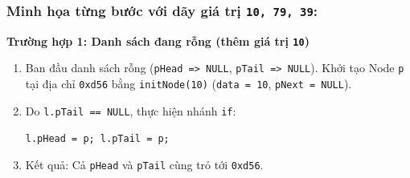 \documentclass[12pt,a4paper]{article}
\begin{document}
\subsubsection*{Minh họa từng bước với dãy giá trị \texttt{10, 79, 39}:}

\noindent\textbf{Trường hợp 1: Danh sách đang rỗng (thêm giá trị \texttt{10})}
\begin{enumerate}[itemsep=0.15em]
    \item Ban đầu danh sách rỗng (\texttt{pHead => NULL}, \texttt{pTail => NULL}). Khởi tạo Node \texttt{p} tại địa chỉ \texttt{0xd56} bằng \texttt{initNode(10)} (\texttt{data = 10}, \texttt{pNext = NULL}).
    \item Do \texttt{l.pTail == NULL}, thực hiện nhánh \texttt{if}:
    \begin{center}
        \texttt{l.pHead = p; \quad l.pTail = p;}
    \end{center}
    \item Kết quả: Cả \texttt{pHead} và \texttt{pTail} cùng trỏ tới \texttt{0xd56}.
\end{enumerate}
\end{document}
